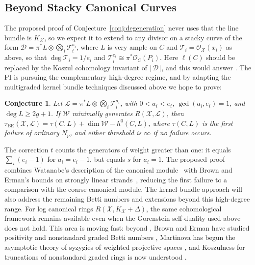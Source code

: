 \documentclass[11pt,reqno]{amsart}
\newtheorem{conjecture}[lemma]{Conjecture}
\theoremstyle{remark}
\newcommand{\BE}{\operatorname{BE}}
\newcommand{\cD}{\mathcal{D}}
\newcommand{\cL}{\mathcal{L}}
\newcommand{\cO}{\mathcal{O}}
\newcommand{\cT}{\mathcal{T}}
\newcommand{\cW}{\mathcal{W}}
\newcommand{\cX}{\mathcal{X}}
\begin{document}
\subsection{Beyond Stacky Canonical Curves}\label{subsec:stacks-further}

The proposed proof of Conjecture~\ref{conj:degeneration} never uses that the line bundle is $K_{\cX}$, so we expect it to extend to any divisor on a stacky curve of the form $\cD=\pi^*L\otimes\bigotimes_i\cT_i^{a_i}$, where $L$ is very ample on $C$ and $\cT_i=\cO_{\cX}(x_i)$ as above, so that $\deg\cT_i=1/e_i$ and $\cT_i^{e_i}\cong\pi^*\cO_C(P_i)$. Here $\ell(C)$ should be replaced by the Koszul cohomology invariant of $\lfloor\cD\rfloor$, and this would answer \cite[Question 7.6]{brownErman25}. The PI is pursuing the complementary high-degree regime, and by adapting the multigraded kernel bundle techniques discussed above we hope to prove:
 
\begin{conjecture}\label{conj:high-degree}
Let $\cL=\pi^*L\otimes\bigotimes_i\cT_i^{a_i}$, with $0<a_i<e_i$, $\gcd(a_i,e_i)=1$, and $\deg L\geq2g+1$. If $\cW$ minimally generates $R(\cX,\cL)$, then $\tau_{\BE}(\cX,\cL)=\tau(C,L)+\dim\cW-h^0(C,L)$, where $\tau(C,L)$ is the first failure of ordinary $N_p$, and either threshold is $\infty$ if no failure occurs.
\end{conjecture}
The correction $t$ counts the generators of weight greater than one: it equals $\sum_i(e_i-1)$ for $a_i=e_i-1$, but equals $s$ for $a_i=1$. The proposed proof combines Watanabe's description of the canonical module~\cite{watanabe81} with Brown and Erman's bounds on strongly linear strands~\cite{brownErman25}, reducing the first failure to a comparison with the coarse canonical module. The kernel-bundle approach will also address the remaining Betti numbers and extensions beyond this high-degree range. For log canonical rings $R(\cX,K_{\cX}+\Delta)$, the same cohomological framework remains available even when the Gorenstein self-duality used above does not hold. This area is moving fast: beyond \cite{brownErman25,brownErmanStrands24,banksCobbSayrafi26}, Brown and Erman have studied positivity and nonstandard graded Betti numbers \cite{brownErman24-2}, Martinova has begun the asymptotic theory of syzygies of weighted projective spaces \cite{martinova25}, and Koszulness for truncations of nonstandard graded rings is now understood \cite{DB25}. 
\end{document}
